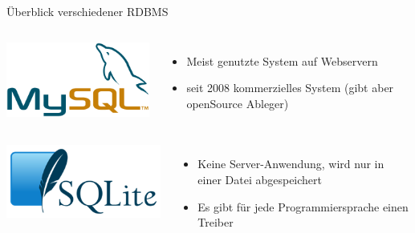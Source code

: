 \documentclass[18pt]{beamer}
\begin{document}
\begin{frame}{Überblick verschiedener RDBMS}
\begin{columns}
	\includegraphics[width=0.99\textwidth]{images/mysql} 
  \begin{itemize}
  \item Meist genutzte System auf Webservern
  \item seit 2008 kommerzielles System (gibt aber openSource Ableger)
  \end{itemize}
\end{columns}\medskip\par

\begin{columns}
	\includegraphics[width=0.99\textwidth]{images/sqlite} 
  \begin{itemize}
  \item Keine Server-Anwendung, wird nur in einer Datei abgespeichert
  \item Es gibt für jede Programmiersprache einen Treiber
  \end{itemize}
\end{columns}\medskip\par


\end{frame}
\end{document}
